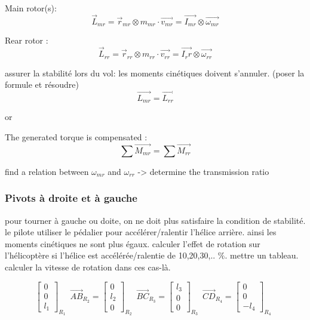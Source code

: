 \documentclass[12pt,a4paper]{article}
\begin{document}
Main rotor(s):
\begin{equation}
	\vec{L}_{mr}=\vec{r}_{mr} \otimes m_{mr} \cdot \vec{v_{mr}}=\vec{I_{mr}} \otimes \vec{\omega_{mr}}
\end{equation}


Rear rotor : 
\begin{equation}
	\vec{L}_{rr}=\vec{r}_{rr} \otimes m_{rr} \cdot \vec{v_{rr}}=\vec{I_rr} \otimes \vec{\omega_{rr}}
\end{equation}

assurer la stabilité lors du vol: les moments cinétiques doivent s'annuler. (poser la formule et résoudre)
\begin{equation}
	\vec{L_{mr}}=\vec{L_{rr}}
\end{equation}

or

The generated torque is compensated : 
\begin{equation}
	\sum \vec{M_{mr}}=\sum \vec{M_{rr}}
\end{equation}

find a relation between $\omega_{mr}$ and $\omega_{rr}$ -> determine the transmission ratio

\subsubsection{Pivots à droite et à gauche}
pour tourner à gauche ou doite, on ne doit plus satisfaire la condition de stabilité. le pilote utiliser le pédalier pour accélérer/ralentir l'hélice arrière. ainsi les moments cinétiques ne sont plus égaux.
\medbreak
calculer l'effet de rotation sur l'hélicoptère si l'hélice est accélérée/ralentie de 10,20,30,.. $\%$. mettre un tableau. calculer la vitesse de rotation dans ces cas-là. 


\begin{equation}
	\begin{bmatrix}
		0 \\
		0\\
		l_1
	\end{bmatrix}_{R_{1}} \enspace
	\vec{AB}_{R_{2}}=
	\begin{bmatrix}
		0 \\
		l_2\\
		0
	\end{bmatrix}_{R_{2}} \enspace
	\vec{BC}_{R_{3}}=
	\begin{bmatrix}
		l_3 \\
		0\\
		0
	\end{bmatrix}_{R_{3}} \enspace
	\vec{CD}_{R_{4}}=
	\begin{bmatrix}
		0 \\
		0\\
		-l_4
	\end{bmatrix}_{R_{4}} \enspace
\end{equation}
\end{document}
